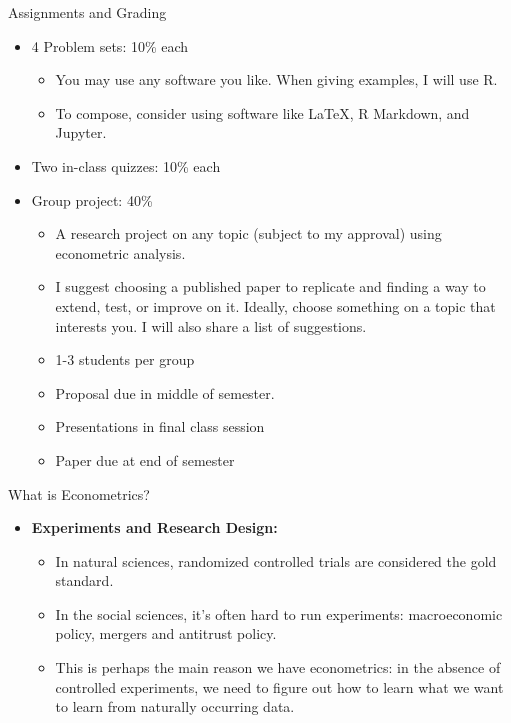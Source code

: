 \documentclass[aspectratio=169,11pt]{beamer}
\begin{document}
\begin{frame}{Assignments and Grading}
\begin{itemize}
	\item 4 Problem sets: 10\% each
		\begin{itemize}
		\item You may use any software you like. When giving examples, I will use R.
		\item To compose, consider using software like LaTeX, R Markdown, and Jupyter.
	\end{itemize}

	\smallskip
	\item Two in-class quizzes: 10\% each


	\smallskip
	\item Group project: 40\%
	\begin{itemize}
		\item A research project on any topic (subject to my approval) using econometric analysis.
		\item I suggest choosing a published paper to replicate and finding a way to extend, test, or improve on it.  
		Ideally, choose something on a topic that interests you. I will also share a list of suggestions. 
		\item 1-3 students per group
		\item Proposal due in middle of semester. 
		\item Presentations in final class session
		\item Paper due at end of semester
	\end{itemize}

\end{itemize}
\end{frame}







\begin{frame}{What is Econometrics?}
\begin{itemize}
	\item {\bf Experiments and Research Design:}
	\begin{itemize}
			\item In natural sciences, randomized controlled trials are considered the gold standard.
			\medskip
			\item In the social sciences, it's often hard to run experiments: macroeconomic policy, 
			mergers and antitrust policy.
			\medskip
			\item This is perhaps the main reason we have econometrics: in the absence of controlled 
			experiments, we need to figure out how to learn what we want to learn from naturally 
			occurring data.
	\end{itemize}
\end{itemize}
\end{frame}	
	
\end{document}
